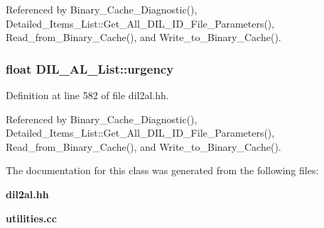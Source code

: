 Referenced by Binary\_\-Cache\_\-Diagnostic(), Detailed\_\-Items\_\-List::Get\_\-All\_\-DIL\_\-ID\_\-File\_\-Parameters(), Read\_\-from\_\-Binary\_\-Cache(), and Write\_\-to\_\-Binary\_\-Cache().
\subsubsection{\setlength{\rightskip}{0pt plus 5cm}float DIL\_\-AL\_\-List::urgency}\label{classDIL__AL__List_m4}




Definition at line 582 of file dil2al.hh.

Referenced by Binary\_\-Cache\_\-Diagnostic(), Detailed\_\-Items\_\-List::Get\_\-All\_\-DIL\_\-ID\_\-File\_\-Parameters(), Read\_\-from\_\-Binary\_\-Cache(), and Write\_\-to\_\-Binary\_\-Cache().

The documentation for this class was generated from the following files:\begin{CompactItemize}
\item 
{\bf dil2al.hh}\item 
{\bf utilities.cc}\end{CompactItemize}
